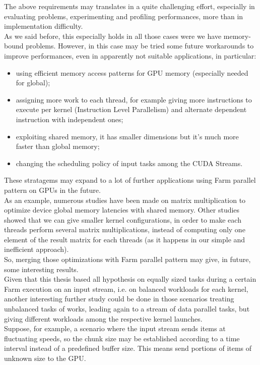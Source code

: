 The above requirements may translates in a quite challenging effort, especially in evaluating problems, experimenting and profiling performances, more than in implementation difficulty.\\
As we said before, this especially holds in all those cases were we have memory-bound problems. However, in this case may be tried some future workarounds to improve performances, even in apparently not suitable applications, in particular:
\begin{itemize}
	\item using efficient memory access patterns for GPU memory (especially needed for global);
	\item assigning more work to each thread, for example giving more instructions to execute per kernel (Instruction Level Parallelism) and alternate dependent instruction with independent ones\cite{cudabestpractices,loweroccupancy};
	\item exploiting shared memory, it has smaller dimensions but it's much more faster than global memory;
	\item changing the scheduling policy of input tasks among the CUDA Streams.
\end{itemize} 
These stratagems may expand to a lot of further applications using Farm parallel pattern on GPUs in the future.\\
As an example, numerous studies have been made on matrix multiplication to optimize device global memory latencies with shared memory.
Other studies showed that we can give smaller kernel configurations, in order to make each threads perform several matrix multiplications\cite{loweroccupancy}, instead of computing only one element of the result matrix for each threads (as it happens in our simple and inefficient approach).\\
So, merging those optimizations with Farm parallel pattern may give, in future, some interesting results.\\


 Given that this thesis based all hypothesis on equally sized tasks during a certain Farm execution on an input stream, i.e. on balanced workloads for each kernel, another interesting further study could be done in those scenarios treating unbalanced tasks of works, leading again to a stream of data parallel tasks, but giving different workloads among the respective kernel launches.\\
 Suppose, for example, a scenario where the input stream sends items at fluctuating speeds, so the chunk size may be established according to a time interval instead of a predefined buffer size. This means send portions of items of unknown size to the GPU.\\
 
